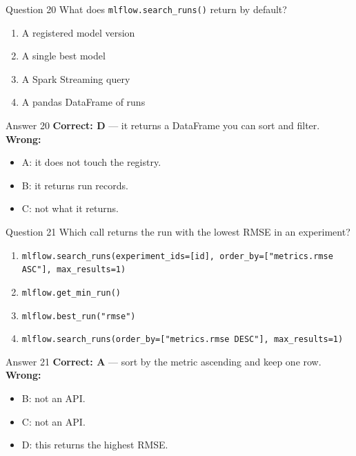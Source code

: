 \documentclass[aspectratio=169,11pt]{beamer}
\begin{document}
	\begin{frame}{Question 20}
		What does \texttt{mlflow.search\_runs()} return by default?
		\begin{enumerate}[label=\Alph*.]
			\item A registered model version
			\item A single best model
			\item A Spark Streaming query
			\item A pandas DataFrame of runs
		\end{enumerate}
	\end{frame}
	\begin{frame}{Answer 20}
		\textbf{Correct: D} --- it returns a DataFrame you can sort and filter.\\
		\vspace{0.5em}
		\textbf{Wrong:}
		\begin{itemize}
			\item A: it does not touch the registry.
			\item B: it returns run records.
			\item C: not what it returns.
		\end{itemize}
	\end{frame}
	
	\begin{frame}{Question 21}
		Which call returns the run with the lowest RMSE in an experiment?
		\begin{enumerate}[label=\Alph*.]
			\item \texttt{mlflow.search\_runs(experiment\_ids=[id], order\_by=["metrics.rmse ASC"], max\_results=1)}
			\item \texttt{mlflow.get\_min\_run()}
			\item \texttt{mlflow.best\_run("rmse")}
			\item \texttt{mlflow.search\_runs(order\_by=["metrics.rmse DESC"], max\_results=1)}
		\end{enumerate}
	\end{frame}
	\begin{frame}{Answer 21}
		\textbf{Correct: A} --- sort by the metric ascending and keep one row.\\
		\vspace{0.5em}
		\textbf{Wrong:}
		\begin{itemize}
			\item B: not an API.
			\item C: not an API.
			\item D: this returns the highest RMSE.
		\end{itemize}
	\end{frame}
	
\end{document}
